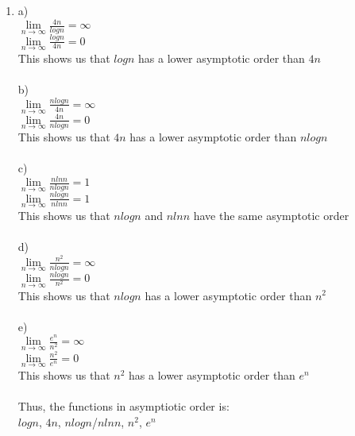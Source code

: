 \documentclass[11pt]{article}
\begin{document}
\begin{enumerate}
\item
    \tab a)\\
    \tab \tab $\lim \limits_{n \to \infty} \frac{4n}{logn} = \infty$\\
    \tab \tab $\lim \limits_{n \to \infty} \frac{logn}{4n}= 0$\\
    \tab \tab This shows us that $logn$ has a lower asymptotic order than $4n$\\ \\
    \tab b)\\
    \tab \tab $\lim \limits_{n \to \infty} \frac{nlogn}{4n} = \infty$\\
    \tab \tab $\lim \limits_{n \to \infty} \frac{4n}{nlogn}= 0$\\
    \tab \tab This shows us that $4n$ has a lower asymptotic order than $nlogn$\\ \\
    \tab c)\\
    \tab \tab $\lim \limits_{n \to \infty} \frac{nlnn}{nlogn} = 1$\\
    \tab \tab $\lim \limits_{n \to \infty} \frac{nlogn}{nlnn} = 1$\\
    \tab \tab This shows us that $nlogn$ and $nlnn$ have the same asymptotic order\\ \\
    \tab d)\\
    \tab \tab $\lim \limits_{n \to \infty} \frac{n^2}{nlogn} = \infty$\\
    \tab \tab $\lim \limits_{n \to \infty} \frac{nlogn}{n^2} = 0$\\
    \tab \tab This shows us that $nlogn$ has a lower asymptotic order than $n^2$\\ \\
    \tab e)\\
    \tab \tab $\lim \limits_{n \to \infty} \frac{e^n}{n^2} = \infty$\\
    \tab \tab $\lim \limits_{n \to \infty} \frac{n^2}{e^n} = 0$\\
    \tab \tab This shows us that $n^2$ has a lower asymptotic order than $e^n$\\ \\
    
    \tab Thus, the functions in asymptiotic order is: \\
    \tab $logn$, $4n$, $nlogn$/$nlnn$, $n^2$, $e^n$ \\





\end{enumerate}
\end{document}
